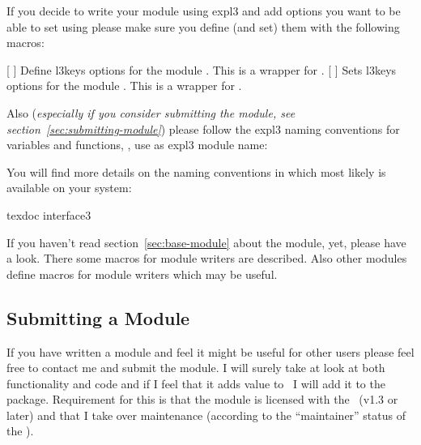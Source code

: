 \documentclass{chemmacros-manual}
\begin{document}
If you decide to write your module  using expl3 and add
options you want to be able to set using
 please make sure you define (and set)
them with the following macros:
\begin{commands}
  [  ]
    Define l3keys options for the module .  This is a wrapper for
      .
  [  ]
    Sets l3keys options for the module .  This is a wrapper for
      .
\end{commands}
Also (\emph{especially if you consider submitting the module, see
  section~\vref{sec:submitting-module}}) please follow the expl3 naming
conventions for variables and functions, \ie, use  as expl3
module name:
You will find more details on the naming conventions in 
which most likely is available on your system:
\begin{lbash}
  texdoc interface3
\end{lbash}
If you haven't read section~\vref{sec:base-module} about the 
module, yet, please have a look.  There some macros for module writers are
described.  Also other modules define macros for module writers which may be
useful.

\subsection{Submitting a Module}\label{sec:submitting-module}

If you have written a module and feel it might be useful for other users
please feel free to contact me and submit the module.  I will surely take at
look at both functionality and code and if I feel that it adds value to
\chemmacros\ I will add it to the package.  Requirement for this is that the
module is licensed with the \LPPL\ (v1.3 or later) and that I take over
maintenance (according to the \enquote{maintainer} status of the \lppl).
\end{document}
